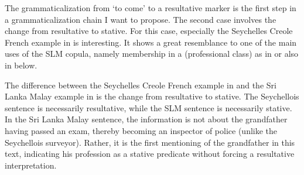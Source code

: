 \documentclass[a4paper,12pt]{article}
\begin{document}


The grammaticalization from `to come' to a resultative marker is the first step in a grammaticalization chain I want to propose. The second case involves the change from resultative to stative. For this case, especially the Seychelles Creole French example in  is interesting. It shows a great resemblance to one of the main uses of the SLM copula, namely membership in a (professional class) as in  or also in  below.


The difference between   the Seychelles Creole French example in  and the Sri Lanka Malay example in  is the change from resultative to stative. The Seychellois sentence is necessarily resultative, while the SLM sentence is necessarily stative. In the Sri Lanka Malay sentence, the information is not about the grandfather having passed an exam, thereby becoming an inspector of police (unlike the Seychellois surveyor). Rather, it is the first mentioning of the grandfather in this text, indicating his profession as a stative predicate without forcing a resultative interpretation.
\end{document}
